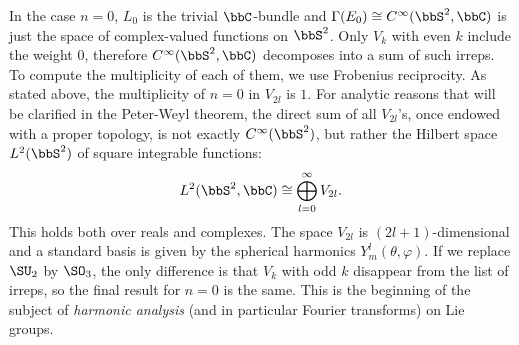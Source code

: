 \begin{example}
    In the case $n=0$, $L_0$ is the trivial $\bbC$-bundle and $\Gamma(E_0)\cong C^\infty(\bbS^2,\bbC)$ is just the space of complex-valued functions on $\bbS^2$. Only $V_k$ with even $k$ include the weight $0$, therefore $C^\infty(\bbS^2,\bbC)$ decomposes into a sum of such irreps. To compute the multiplicity of each of them, we use Frobenius reciprocity. As stated above, the multiplicity of $n=0$ in $V_{2l}$ is $1$. For analytic reasons that will be clarified in the Peter-Weyl theorem, the direct sum of all $V_{2l}$'s, once endowed with a proper topology, is not exactly $C^\infty(\bbS^2)$, but rather the Hilbert space $L^2(\bbS^2)$ of square integrable functions:
    \[L^2(\bbS^2,\bbC)\cong \bigoplus_{l=0}^\infty V_{2l}.\]
    This holds both over reals and complexes. The space $V_{2l}$ is $(2l+1)$-dimensional and a standard basis is given by the spherical harmonics $Y^l_m(\theta,\varphi)$. If we replace $\SU_2$ by $\SO_3$, the only difference is that $V_k$ with odd $k$ disappear from the list of irreps, so the final result for $n=0$ is the same. This is the beginning of the subject of \emph{harmonic analysis} (and in particular Fourier transforms) on Lie groups.
\end{example}








